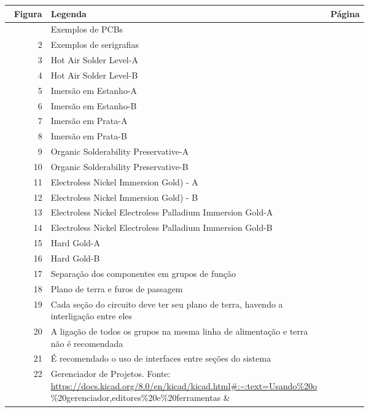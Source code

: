\begingroup\small
\begin{longtable}{@{}r>{\raggedright\arraybackslash}p{0.68\linewidth}r@{}}
\toprule
Figura & Legenda & Página \\
\midrule
\endhead
\bottomrule
\endfoot
1 & Exemplos de PCBs & \pageref{fig:01} \\
2 & Exemplos de serigrafias & \pageref{fig:02} \\
3 & Hot Air Solder Level-A & \pageref{fig:03} \\
4 & Hot Air Solder Level-B & \pageref{fig:04} \\
5 & Imersão em Estanho-A & \pageref{fig:05} \\
6 & Imersão em Estanho-B & \pageref{fig:06} \\
7 & Imersão em Prata-A & \pageref{fig:07} \\
8 & Imersão em Prata-B & \pageref{fig:08} \\
9 & Organic Solderability Preservative-A & \pageref{fig:09} \\
10 & Organic Solderability Preservative-B & \pageref{fig:10} \\
11 & Electroless Nickel Immersion Gold) - A & \pageref{fig:11} \\
12 & Electroless Nickel Immersion Gold) - B & \pageref{fig:12} \\
13 & Electroless Nickel Electroless Palladium Immersion Gold-A & \pageref{fig:13} \\
14 & Electroless Nickel Electroless Palladium Immersion Gold-B & \pageref{fig:14} \\
15 & Hard Gold-A & \pageref{fig:15} \\
16 & Hard Gold-B & \pageref{fig:16} \\
17 & Separação dos componentes em grupos de função & \pageref{fig:17} \\
18 & Plano de terra e furos de passagem & \pageref{fig:18} \\
19 & Cada seção do circuito deve ter seu plano de terra, havendo a interligação entre eles & \pageref{fig:19} \\
20 & A ligação de todos os grupos na mesma linha de alimentação e terra não é recomendada & \pageref{fig:20} \\
21 & É recomendado o uso de interfaces entre seções do sistema & \pageref{fig:21} \\
22 & Gerenciador de Projetos. Fonte: \url{https://docs.kicad.org/8.0/en/kicad/kicad.html#:~:text=Usando%20o} \%20gerenciador,editores\%20e\%20ferramentas & \pageref{fig:22} \\

\end{longtable}
